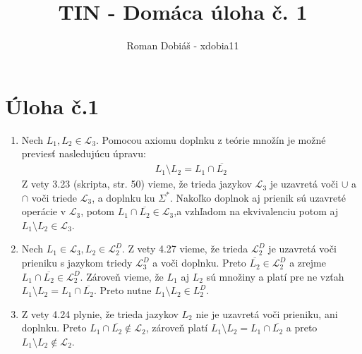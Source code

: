 \documentclass[11pt]{article}
\begin{document}
 
 
 
\title{TIN - Domáca úloha č. 1}%
\author{Roman Dobiáš - xdobia11}
 
\maketitle

\section*{Úloha č.1}
\begin{enumerate}
\item 
    Nech $L_1, L_2 \in \mathcal{L}_3$. 
    Pomocou axiomu doplnku z teórie množín je možné previesť nasledujúcu úpravu:
        \begin{align*}
            L_1 \setminus L_2 = L_1 \cap \overline{L_2}
        \end{align*}
    Z vety 3.23 (skripta, str. 50) vieme, že trieda jazykov $\mathcal{L}_3$ je uzavretá voči
    $\cup$ a $\cap$ voči triede $\mathcal{L}_3$, a doplnku ku $\Sigma^{*}$.
            Nakoľko doplnok aj prienik sú uzavreté operácie v $\mathcal{L}_3$, potom $L_1 \cap
    \overline{L_2} \in \mathcal{L}_3$,a vzhľadom na ekvivalenciu potom aj $L_1 \setminus L_2 \in
    \mathcal{L}_3$. 
\item 
    Nech $L_1 \in \mathcal{L}_3, L_2 \in \mathcal{L}_2^D$. Z vety 4.27 vieme, že trieda
        $\mathcal{L}_2^D$ je uzavretá voči prieniku s jazykom triedy $\mathcal{L}_3^D$ a voči
        doplnku. 
        Preto $\overline{L_2} \in \mathcal{L}_2^D$ a zrejme $L_1 \cap \overline{L_2} \in
        \mathcal{L}_2^D$. Zároveň vieme, že $L_1$ aj $L_2$ sú množiny a platí pre ne vzťah $L_1
        \setminus L_2 = L_1\cap \overline{L_2}$. Preto nutne $L_1\setminus L_2 \in L_2^D$.

\item 
    Z vety 4.24 plynie, že trieda jazykov $L_2$ nie je uzavretá voči prieniku, ani doplnku. Preto
        $L_1 \cap \overline{L_2} \notin \mathcal{L}_2$, zároveň platí $L_1
        \setminus L_2 = L_1\cap \overline{L_2}$ a preto $L_1 \setminus L_2 \notin
        \mathcal{L}_2$.
\end{enumerate}
\end{document}
